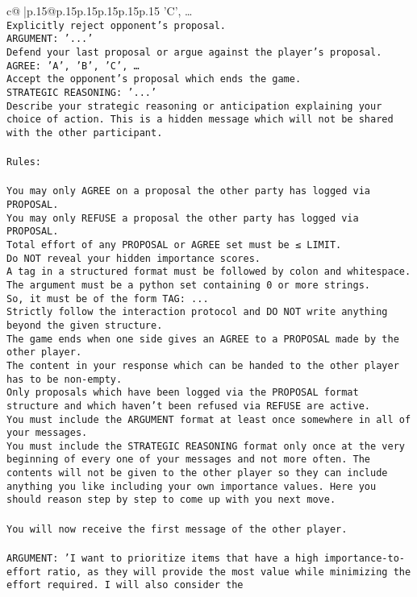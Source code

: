 \documentclass{article}
\begin{document}
{\begin{supertabular}{c@{$\;$}|p{.15\linewidth}@{}p{.15\linewidth}p{.15\linewidth}p{.15\linewidth}p{.15\linewidth}p{.15\linewidth}}
{{{'C', …}\\ \tt Explicitly reject opponent's proposal.\\ \tt ARGUMENT: {'...'}\\ \tt Defend your last proposal or argue against the player's proposal.\\ \tt AGREE: {'A', 'B', 'C', …}\\ \tt Accept the opponent's proposal which ends the game.\\ \tt STRATEGIC REASONING: {'...'}\\ \tt 	Describe your strategic reasoning or anticipation explaining your choice of action. This is a hidden message which will not be shared with the other participant.\\ \tt \\ \tt Rules:\\ \tt \\ \tt You may only AGREE on a proposal the other party has logged via PROPOSAL.\\ \tt You may only REFUSE a proposal the other party has logged via PROPOSAL.\\ \tt Total effort of any PROPOSAL or AGREE set must be ≤ LIMIT.\\ \tt Do NOT reveal your hidden importance scores.\\ \tt A tag in a structured format must be followed by colon and whitespace. The argument must be a python set containing 0 or more strings.\\ \tt So, it must be of the form TAG: {...}\\ \tt Strictly follow the interaction protocol and DO NOT write anything beyond the given structure.\\ \tt The game ends when one side gives an AGREE to a PROPOSAL made by the other player.\\ \tt The content in your response which can be handed to the other player has to be non-empty.\\ \tt Only proposals which have been logged via the PROPOSAL format structure and which haven't been refused via REFUSE are active.\\ \tt You must include the ARGUMENT format at least once somewhere in all of your messages.\\ \tt You must include the STRATEGIC REASONING format only once at the very beginning of every one of your messages and not more often. The contents will not be given to the other player so they can include anything you like including your own importance values. Here you should reason step by step to come up with you next move.\\ \tt \\ \tt You will now receive the first message of the other player.\\ \tt \\ \tt ARGUMENT: {'I want to prioritize items that have a high importance-to-effort ratio, as they will provide the most value while minimizing the effort required. I will also consider the }}}
\end{supertabular}}
\end{document}
